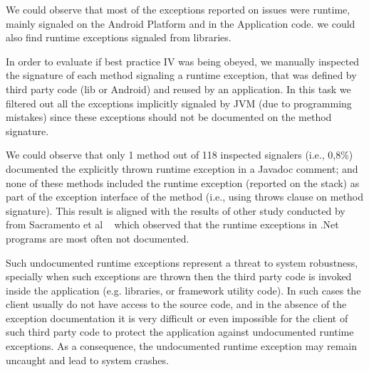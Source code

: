 \documentclass[conference]{IEEEtran}
\begin{document}

We could observe that most of the exceptions reported on issues were runtime, 
mainly  signaled on the Android Platform and in the Application code. we could also find 
runtime exceptions signaled from libraries.

In order to evaluate if  best practice IV was being obeyed, we manually inspected the   
signature of each method signaling a runtime exception, that was defined by third 
party code (lib or Android) and reused by an application.
In this task we filtered out all the exceptions implicitly 
signaled by  JVM (due to programming mistakes) since these exceptions should not be documented on the 
method signature. 

We could observe that only 1 method out of 118 inspected signalers
 (i.e., 0,8\%) documented the explicitly thrown runtime exception in a Javadoc comment; and none of these methods
included the runtime exception  (reported on the stack) as part of the exception interface of the method (i.e., using 
throws clause on method signature). This result is aligned with the results of other  study conducted by from 
Sacramento et al ~\cite{sacramento2006unchecked} which observed that the
runtime exceptions in .Net programs are most often not documented.

Such undocumented runtime exceptions represent a threat to system robustness, specially
when such exceptions are thrown then the third party code is invoked inside the application 
(e.g. libraries, or framework utility code). In such cases the client usually do not have access to 
the source code, and in the absence of
the exception documentation it is very difficult or even impossible for the client of such third party code to 
protect the application against undocumented runtime exceptions. As a consequence, the
 undocumented runtime exception may remain uncaught and lead to system crashes.
\end{document}
